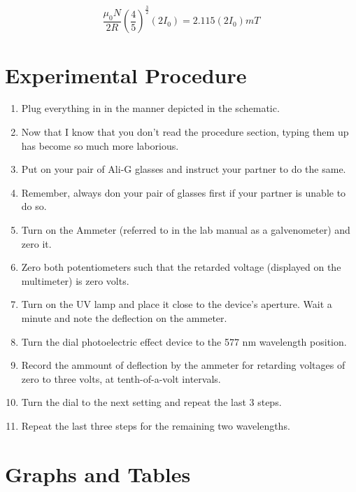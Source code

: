 \documentclass{amsart}
\begin{document}
\begin{equation}
    \dfrac{\mu_0 N}{2R}\left(\dfrac{4}{5}\right)^{\frac{3}{2}}(2I_0) = 2.115(2I_0)mT
\end{equation}

\section{Experimental Procedure}
\begin{enumerate}
    \item Plug everything in in the manner depicted in the schematic.
    \item Now that I know that you don't read the procedure section, typing them up has become so much more laborious.
    \item Put on your pair of Ali-G glasses and instruct your partner to do the same.
    \item Remember, always don your pair of glasses first if your partner is unable to do so.
    \item Turn on the Ammeter (referred to in the lab manual as a galvenometer) and zero it.
    \item Zero both potentiometers such that the retarded voltage (displayed on the multimeter) is zero volts.
    \item Turn on the UV lamp and place it close to the device's aperture. Wait a minute and note the deflection on the ammeter.
    \item Turn the dial photoelectric effect device to the 577 nm wavelength position.
    \item Record the ammount of deflection by the ammeter for retarding voltages of zero to three volts, at tenth-of-a-volt intervals.
    \item Turn the dial to the next setting and repeat the last 3 steps.
    \item Repeat the last three steps for the remaining two wavelengths.
\end{enumerate}

\section{Graphs and Tables}
\end{document}
